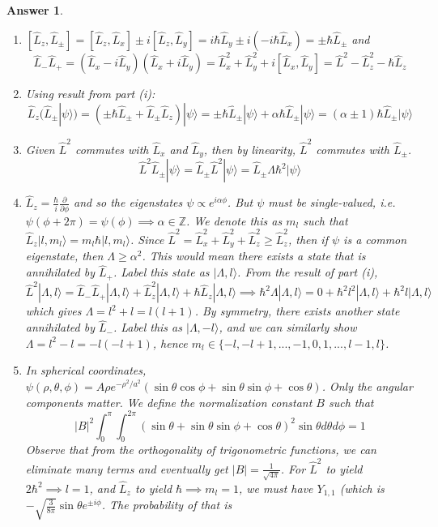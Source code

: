 \documentclass[a4paper]{article}
\newtheorem{ans}{Answer}[subsection]
\theoremstyle{new}
\begin{document}
\newpage
\begin{ans}\leavevmode
\begin{enumerate}[label=(\roman*)]
\item $[\hat{L}_z,\hat{L}_\pm]=[\hat{L}_z,\hat{L}_x]\pm i[\hat{L}_z,\hat{L}_y]=i\hbar\hat{L}_y\pm i(-i\hbar\hat{L}_x)=\pm\hbar\hat{L}_\pm$ and
$$\hat{L}_-\hat{L}_+=(\hat{L}_x-i\hat{L}_y)(\hat{L}_x+i\hat{L}_y)=\hat{L}_x^2+\hat{L}_y^2+i[\hat{L}_x,\hat{L}_y]=\hat{L}^2-\hat{L}_z^2-\hbar\hat{L}_z$$
\item Using result from part (i):
$$\hat{L}_z(\hat{L}_\pm|\psi\rangle)=(\pm\hbar\hat{L}_\pm+\hat{L}_\pm\hat{L}_z)|\psi\rangle=\pm\hbar\hat{L}_\pm|\psi\rangle+\alpha\hbar\hat{L}_\pm|\psi\rangle=(\alpha\pm1)\hbar\hat{L}_\pm|\psi\rangle$$
\item Given $\hat{L}^2$ commutes with $\hat{L}_x$ and $\hat{L}_y$, then by linearity, $\hat{L}^2$ commutes with $\hat{L}_\pm$.
$$\hat{L}^2\hat{L}_\pm|\psi\rangle=\hat{L}_\pm\hat{L}^2|\psi\rangle=\hat{L}_\pm\Lambda\hbar^2|\psi\rangle$$
\item $\hat{L}_z=\frac{\hbar}{i}\frac{\partial}{\partial\phi}$ and so the eigenstates $\psi\propto e^{i\alpha\phi}$. But $\psi$ must be single-valued, i.e. $\psi(\phi+2\pi)=\psi(\phi)\implies\alpha\in\mathbb{Z}$. We denote this as $m_l$ such that $\hat{L}_z|l,m_l\rangle=m_l\hbar|l,m_l\rangle$. Since $\hat{L}^2=\hat{L}_x^2+\hat{L}_y^2+\hat{L}_z^2\geq\hat{L}_z^2$, then if $\psi$ is a common eigenstate, then $\Lambda\geq\alpha^2$. This would mean there exists a state that is annihilated by $\hat{L}_+$. Label this state as $|\Lambda,l\rangle$. From the result of part (i),
$$\hat{L}^2|\Lambda,l\rangle=\hat{L}_-\hat{L}_+|\Lambda,l\rangle+\hat{L}_z^2|\Lambda,l\rangle+\hbar\hat{L}_z|\Lambda,l\rangle\implies\hbar^2\Lambda|\Lambda,l\rangle=0+\hbar^2l^2|\Lambda,l\rangle+\hbar^2l|\Lambda,l\rangle$$
which gives $\Lambda=l^2+l=l(l+1)$. By symmetry, there exists another state annihilated by $\hat{L}_-$. Label this as $|\Lambda,-l\rangle$, and we can similarly show $\Lambda=l^2-l=-l(-l+1)$, hence $m_l\in\{-l,-l+1,...,-1,0,1,...,l-1,l\}$.
\item In spherical coordinates, $\psi(\rho,\theta,\phi)=A\rho e^{-\rho^2/a^2}(\sin\theta\cos\phi+\sin\theta\sin\phi+\cos\theta)$. Only the angular components matter. We define the normalization constant $B$ such that
$$|B|^2\int_0^\pi\int_0^{2\pi}(\sin\theta+\sin\theta\sin\phi+\cos\theta)^2\sin\theta d\theta d\phi=1$$
Observe that from the orthogonality of trigonometric functions, we can eliminate many terms and eventually get $|B|=\frac{1}{\sqrt{4\pi}}$. For $\hat{L}^2$ to yield $2\hbar^2\implies l=1$, and $\hat{L}_z$ to yield $\hbar\implies m_l=1$, we must have $Y_{1,1}$ (which is $-\sqrt{\frac{3}{8\pi}}\sin\theta e^{\pm i\phi}$. The probability of that is

\end{enumerate}
\end{ans}
\end{document}
